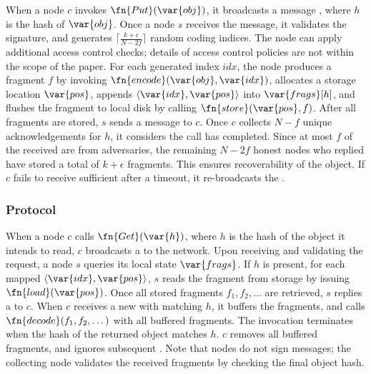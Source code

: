 When a node $c$ invokes $\fn{Put}(\var{obj})$, it broadcasts a message , where $h$ is the hash of $\var{obj}$.
Once a node $s$ receives the message, it validates the signature, and generates $\lceil\frac{k + \epsilon}{N - 2f}\rceil$ random coding indices.
The node can apply additional access control checks;
details of access control policies are not within the scope of the paper.
For each generated index $idx$, the node produces a fragment $f$ by invoking $\fn{encode}(\var{obj}, \var{idx})$, allocates a storage location $\var{pos}$, appends $\langle \var{idx}, \var{pos} \rangle$ into $\var{frags}[h]$, and flushes the fragment to local disk by calling $\fn{store}(\var{pos}, f)$.
After all fragments are stored, $s$ sends a message  to $c$.
Once $c$ collects $N - f$ unique acknowledgements for $h$, it considers the  call has completed.
Since at most $f$ of the received  are from adversaries, the remaining $N - 2f$ honest nodes who replied have stored a total of $k + \epsilon$ fragments.
This ensures recoverability of the object.
If $c$ fails to receive sufficient  after a timeout, it re-broadcasts the .

\subsubsection{ Protocol}

When a node $c$ calls $\fn{Get}(\var{h})$, where $h$ is the hash of the object it intends to read, $c$ broadcasts a  to the network.
Upon receiving and validating the request, a node $s$ queries its local state $\var{frags}$.
If $h$ is present, for each mapped $\langle \var{idx}, \var{pos} \rangle$, $s$ reads the fragment from storage by issuing $\fn{load}(\var{pos})$.
\sloppy
Once all stored fragments $f_1, f_2, \dots$ are retrieved, $s$ replies a  to $c$.
When $c$ receives a new  with matching $h$, it buffers the fragments, and calls $\fn{decode}(f_1, f_2, \dots)$ with all buffered fragments.
The  invocation terminates when the hash of the returned object matches $h$.
$c$ removes all buffered fragments, and ignores subsequent .
Note that nodes do not sign  messages;
the collecting node validates the received fragments by checking the final object hash.

